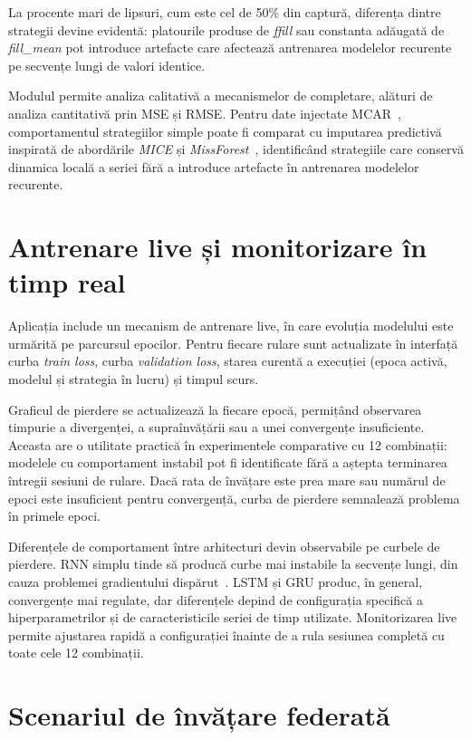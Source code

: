 La procente mari de lipsuri, cum este cel de 50\% din captură, diferența dintre strategii devine evidentă: platourile produse de \textit{ffill} sau constanta adăugată de \textit{fill\_mean} pot introduce artefacte care afectează antrenarea modelelor recurente pe secvențe lungi de valori identice.

Modulul permite analiza calitativă a mecanismelor de completare, alături de analiza cantitativă prin MSE și RMSE. Pentru date injectate MCAR~\cite{rubin1976inference, little2002missing}, comportamentul strategiilor simple poate fi comparat cu imputarea predictivă inspirată de abordările \textit{MICE} și \textit{MissForest}~\cite{buuren2011mice, stekhoven2012missforest}, identificând strategiile care conservă dinamica locală a seriei fără a introduce artefacte în antrenarea modelelor recurente.

\section{Antrenare live și monitorizare în timp real}

Aplicația include un mecanism de antrenare live, în care evoluția modelului este urmărită pe parcursul epocilor. Pentru fiecare rulare sunt actualizate în interfață curba \textit{train loss}, curba \textit{validation loss}, starea curentă a execuției (epoca activă, modelul și strategia în lucru) și timpul scurs.

Graficul de pierdere se actualizează la fiecare epocă, permițând observarea timpurie a divergenței, a supraînvățării sau a unei convergențe insuficiente. Aceasta are o utilitate practică în experimentele comparative cu 12 combinații: modelele cu comportament instabil pot fi identificate fără a aștepta terminarea întregii sesiuni de rulare. Dacă rata de învățare este prea mare sau numărul de epoci este insuficient pentru convergență, curba de pierdere semnalează problema în primele epoci.

Diferențele de comportament între arhitecturi devin observabile pe curbele de pierdere. RNN simplu tinde să producă curbe mai instabile la secvențe lungi, din cauza problemei gradientului dispărut~\cite{hochreiter1997lstm}. LSTM și GRU produc, în general, convergențe mai regulate, dar diferențele depind de configurația specifică a hiperparametrilor și de caracteristicile seriei de timp utilizate. Monitorizarea live permite ajustarea rapidă a configurației înainte de a rula sesiunea completă cu toate cele 12 combinații.

\section{Scenariul de învățare federată}

